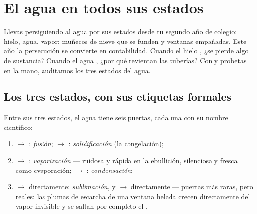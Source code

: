 \chapter{El agua en todos sus estados}\label{ch:g6:water-states}

Llevas persiguiendo al agua por sus estados desde tu segundo año de
colegio: hielo, agua, vapor; muñecos de nieve que se funden y
ventanas empañadas. Este año la persecución se convierte en
contabilidad. Cuando el hielo , ¿se pierde algo de
sustancia? Cuando el agua , ¿por qué revientan las
tuberías? Con  y probetas en la mano, auditamos los tres
estados del agua.

\section{Los tres estados, con sus etiquetas formales}

\begin{definition}\label{def:g6:water-states:changes}
Entre sus tres estados, el agua tiene seis puertas, cada una con su
nombre científico:
\begin{enumerate}
  \item {} $\to$ : \emph{fusión};
         $\to$ :
        \emph{solidificación} (la congelación);
  \item {} $\to$ :
        \emph{vaporización} --- ruidosa y rápida
        en la ebullición, silenciosa y fresca como evaporación;
         $\to$ :
        \emph{condensación};
  \item {} $\to$  directamente:
        \emph{sublimación}, y  $\to$
         directamente --- puertas más raras, pero reales: las
        plumas de escarcha de una ventana helada crecen directamente
        del vapor invisible y se saltan por completo el .
\end{enumerate}
\end{definition}

